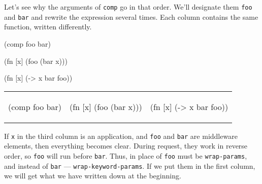 \fi

Let's see why the arguments of \verb|comp| go in that order. We'll designate them \verb|foo| and \verb|bar| and rewrite the expression several times. Each column contains the same function, written differently.

\ifx\DEVICETYPE\MOBILE

\begin{english}
  \begin{clojure}
(comp foo bar)
  \end{clojure}

\splitter

  \begin{clojure}
(fn [x]
  (foo (bar x)))
  \end{clojure}

\splitter

  \begin{clojure}
(fn [x] (-> x
            bar
            foo))
  \end{clojure}
\end{english}

\else

\begin{english}
\noindent
\begin{tabular}{ @{}p{3.2cm} @{}p{3.5cm} @{}p{3.5cm} }

  \begin{clojure}
(comp foo bar)
  \end{clojure}

&

  \begin{clojure}
(fn [x]
  (foo (bar x)))
  \end{clojure}

&

  \begin{clojure}
(fn [x] (-> x
            bar
            foo))
  \end{clojure}

\end{tabular}

\end{english}

\fi

If \verb|x| in the third column is an application, and \verb|foo| and \verb|bar| are middleware elements, then everything becomes clear. During request, they work in reverse order, so \verb|foo| will run before \verb|bar|. Thus, in place of \verb|foo| must be \verb|wrap-params|, and instead of \verb|bar| — \verb|wrap-keyword-params|. If we put them in the first column, we will get what we have written down at the beginning.

